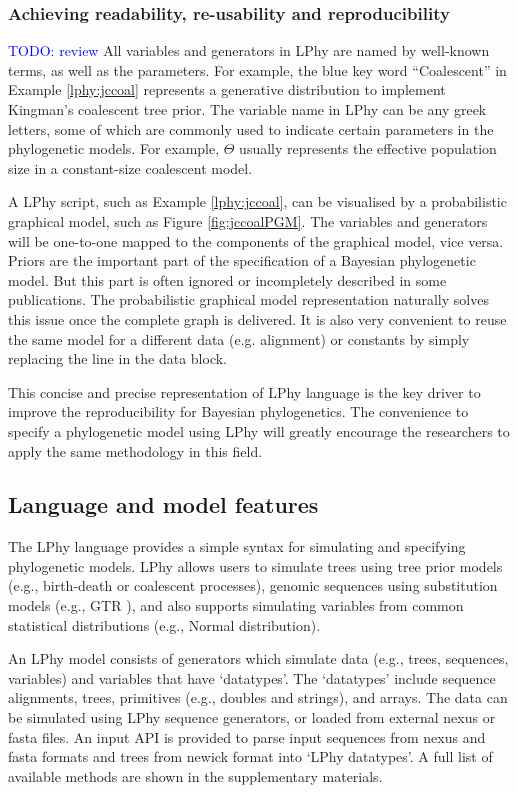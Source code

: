 \documentclass[10pt,letterpaper,table]{article}
\begin{document}
\subsubsection{Achieving readability, re-usability and reproducibility}
\textcolor{blue}{TODO: review} All variables and generators in LPhy are named by well-known terms, as well as the parameters. For example, the blue key word ``Coalescent'' in Example \ref{lphy:jccoal} represents a generative distribution to implement Kingman's coalescent tree prior. 
The variable name in LPhy can be any greek letters, some of which are commonly used to indicate certain parameters in the phylogenetic models. For example, $\Theta$ usually represents the effective population size in a constant-size coalescent model. 

A LPhy script, such as Example \ref{lphy:jccoal}, can be visualised by a probabilistic graphical model, such as Figure \ref{fig:jccoalPGM}. The variables and generators will be one-to-one mapped to the components of the graphical model, vice versa. 
Priors are the important part of the specification of a Bayesian phylogenetic model. But this part is often ignored or incompletely described in some publications. The probabilistic graphical model representation naturally solves this issue once the complete graph is delivered.
It is also very convenient to reuse the same model for a different data (e.g. alignment) or constants by simply replacing the line in the data block.  

This concise and precise representation of LPhy language is the key driver to improve the reproducibility for Bayesian phylogenetics. The convenience to specify a phylogenetic model using LPhy will greatly encourage the researchers to apply the same methodology in this field.


\subsection{Language and model features}
The LPhy language provides a simple syntax for simulating and specifying phylogenetic models.
LPhy allows users to simulate trees using tree prior models (e.g., birth-death or coalescent processes), genomic sequences using substitution models (e.g., GTR \cite{gtr}), and also supports simulating variables from common statistical distributions (e.g., Normal distribution). 

An LPhy model consists of generators which simulate data (e.g., trees, sequences, variables) and variables that have `datatypes'. 
The `datatypes' include sequence alignments, trees, primitives (e.g., doubles and strings), and arrays. 
The data can be simulated using LPhy sequence generators, or loaded from external nexus or fasta files. 
An input API is provided to parse input sequences from nexus and fasta formats and trees from newick format into `LPhy datatypes'. 
A full list of available methods are shown in the supplementary materials.
\end{document}
